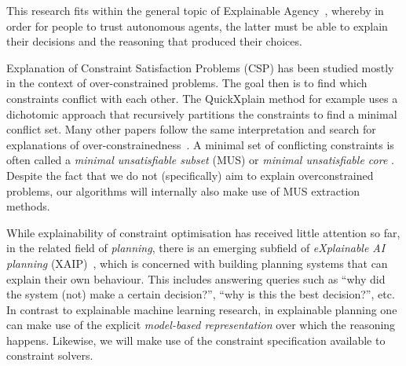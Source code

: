 This research fits within the general topic of Explainable Agency~\cite{langley2017explainable}, whereby in order for people to trust autonomous agents, the latter must be able to explain their decisions and the reasoning that produced their choices. 



Explanation of Constraint Satisfaction Problems (CSP) has been studied mostly in the context of over-constrained problems. 
The goal then is to find which constraints conflict with each other. 
The QuickXplain method \cite{junker2001quickxplain} for example uses a dichotomic approach that recursively partitions the constraints to find a minimal conflict set. Many other papers follow the same interpretation and search for explanations of over-constrainedness~\cite{leo2017debugging,zeighami2018towards}.
A minimal set of conflicting constraints is often called a \emph{minimal unsatisfiable subset} (MUS) or \emph{minimal unsatisfiable core} \cite{marques2010minimal}. Despite the fact that we do not (specifically) aim to explain overconstrained problems, our algorithms will internally also make use of MUS extraction methods. 


While explainability of constraint optimisation has received little attention so far, in the related field of \textit{planning}, there is an emerging subfield of \textit{eXplainable AI planning} (XAIP)~\cite{fox2017explainable}, which is concerned with building planning systems that can explain their own behaviour. This includes answering queries such as ``why did the system (not) make a certain decision?'', ``why is this the best decision?'', etc. In contrast to explainable machine learning research, in explainable planning one can make use of the explicit \textit{model-based representation} over which the reasoning happens. Likewise, we will make use of the constraint specification available to constraint solvers. 

% 
% 

